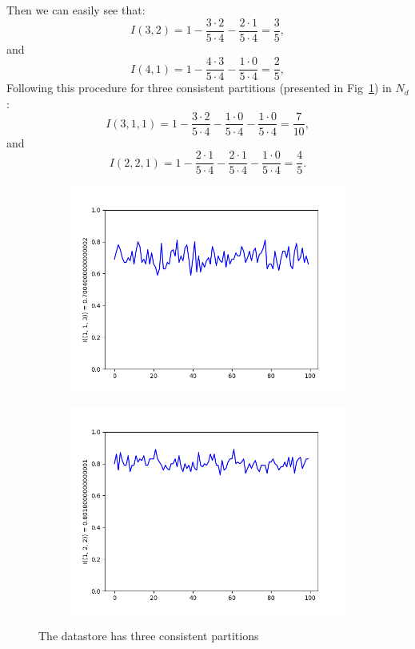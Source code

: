 \documentclass{llncs}
\begin{document}
Then we can easily see that:
\[
	I(3,2) = 1 - \frac{3 \cdot 2}{5 \cdot 4} - \frac{2 \cdot 1}{5 \cdot 4} = \frac{3}{5} ,
\]
and
\[
	I(4,1) = 1 - \frac{4 \cdot 3}{5 \cdot 4} - \frac{1 \cdot 0}{5 \cdot 4} = \frac{2}{5} ,
\]
Following this procedure for three consistent partitions (presented in 
Fig~\ref{pic:three_parts}) in $N_d$:
\[
	I(3,1,1) = 1 - \frac{3 \cdot 2}{5 \cdot 4} - \frac{1 \cdot 0}{5 \cdot 4} - \frac{1 \cdot 0}{5 \cdot 4} = \frac{7}{10} ,
\]
and 
\[
	I(2,2,1) = 1 - \frac{2 \cdot 1}{5 \cdot 4} - \frac{2 \cdot 1}{5  \cdot 4} - \frac{1 \cdot 0}{5 \cdot 4} = \frac{4}{5} .
\]

\begin{figure}[p]
\begin{subfigure}{0.5\linewidth}
\centering\includegraphics[scale=0.4]{images/1-1-3-consistent-partitions-probability.png}
\end{subfigure}
\begin{subfigure}{0.5\linewidth}
\centering\includegraphics[scale=0.4]{images/1-2-2-consistent-partitions-probability.png}
\end{subfigure}
\caption{The datastore has three consistent partitions}\label{pic:three_parts}
\end{figure}
\end{document}
